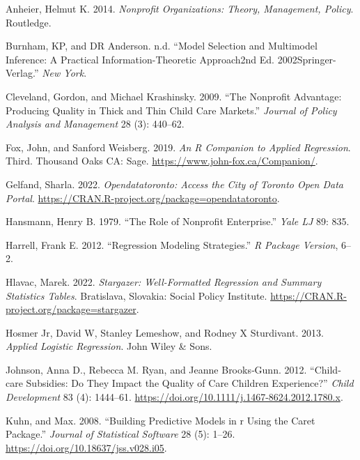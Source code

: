 \documentclass[
  letterpaper,
  DIV=11,
  numbers=noendperiod]{scrartcl}
\newlength{\cslhangindent}
\newenvironment{CSLReferences}[2] %
 {\begin{list}{}{%
  \setlength{\itemindent}{0pt}
  \setlength{\leftmargin}{0pt}
  \setlength{\parsep}{0pt}
  \ifodd #1
   \setlength{\leftmargin}{\cslhangindent}
   \setlength{\itemindent}{-1\cslhangindent}
  \fi
  \setlength{\itemsep}{#2\baselineskip}}}
 {\end{list}}
\begin{document}
\label{refs}
\begin{CSLReferences}{1}{0}
Anheier, Helmut K. 2014. \emph{Nonprofit Organizations: Theory,
Management, Policy}. Routledge.

Burnham, KP, and DR Anderson. n.d. {``Model Selection and Multimodel
Inference: A Practical Information-Theoretic Approach2nd Ed.
2002Springer-Verlag.''} \emph{New York}.

Cleveland, Gordon, and Michael Krashinsky. 2009. {``The Nonprofit
Advantage: Producing Quality in Thick and Thin Child Care Markets.''}
\emph{Journal of Policy Analysis and Management} 28 (3): 440--62.

Fox, John, and Sanford Weisberg. 2019. \emph{An {R} Companion to Applied
Regression}. Third. Thousand Oaks {CA}: Sage.
\url{https://www.john-fox.ca/Companion/}.

Gelfand, Sharla. 2022. \emph{Opendatatoronto: Access the City of Toronto
Open Data Portal}.
\url{https://CRAN.R-project.org/package=opendatatoronto}.

Hansmann, Henry B. 1979. {``The Role of Nonprofit Enterprise.''}
\emph{Yale LJ} 89: 835.

Harrell, Frank E. 2012. {``Regression Modeling Strategies.''} \emph{R
Package Version}, 6--2.

Hlavac, Marek. 2022. \emph{Stargazer: Well-Formatted Regression and
Summary Statistics Tables}. Bratislava, Slovakia: Social Policy
Institute. \url{https://CRAN.R-project.org/package=stargazer}.

Hosmer Jr, David W, Stanley Lemeshow, and Rodney X Sturdivant. 2013.
\emph{Applied Logistic Regression}. John Wiley \& Sons.

Johnson, Anna D., Rebecca M. Ryan, and Jeanne Brooks‐Gunn. 2012.
{``Child‐care Subsidies: Do They Impact the Quality of Care Children
Experience?''} \emph{Child Development} 83 (4): 1444--61.
\url{https://doi.org/10.1111/j.1467-8624.2012.1780.x}.

Kuhn, and Max. 2008. {``Building Predictive Models in r Using the Caret
Package.''} \emph{Journal of Statistical Software} 28 (5): 1--26.
\url{https://doi.org/10.18637/jss.v028.i05}.


\end{CSLReferences}
\end{document}

